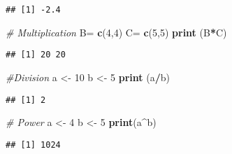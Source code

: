 \documentclass[
]{article}
\newenvironment{Shaded}{\begin{snugshade}}{\end{snugshade}}
\newcommand{\CommentTok}[1]{\textcolor[rgb]{0.56,0.35,0.01}{\textit{#1}}}
\newcommand{\DecValTok}[1]{\textcolor[rgb]{0.00,0.00,0.81}{#1}}
\newcommand{\FunctionTok}[1]{\textcolor[rgb]{0.13,0.29,0.53}{\textbf{#1}}}
\newcommand{\NormalTok}[1]{#1}
\newcommand{\OtherTok}[1]{\textcolor[rgb]{0.56,0.35,0.01}{#1}}
\newcommand{\SpecialCharTok}[1]{\textcolor[rgb]{0.81,0.36,0.00}{\textbf{#1}}}
\begin{document}
\begin{verbatim}
## [1] -2.4
\end{verbatim}

\begin{Shaded}
\begin{Highlighting}[]
\CommentTok{\# Multiplication}
\NormalTok{B}\OtherTok{=} \FunctionTok{c}\NormalTok{(}\DecValTok{4}\NormalTok{,}\DecValTok{4}\NormalTok{) }
\NormalTok{C}\OtherTok{=} \FunctionTok{c}\NormalTok{(}\DecValTok{5}\NormalTok{,}\DecValTok{5}\NormalTok{)}
\FunctionTok{print}\NormalTok{ (B}\SpecialCharTok{*}\NormalTok{C)}
\end{Highlighting}
\end{Shaded}

\begin{verbatim}
## [1] 20 20
\end{verbatim}

\begin{Shaded}
\begin{Highlighting}[]
\CommentTok{\#Division}
\NormalTok{ a }\OtherTok{\textless{}{-}} \DecValTok{10}
\NormalTok{ b }\OtherTok{\textless{}{-}} \DecValTok{5}
 \FunctionTok{print}\NormalTok{ (a}\SpecialCharTok{/}\NormalTok{b)}
\end{Highlighting}
\end{Shaded}

\begin{verbatim}
## [1] 2
\end{verbatim}

\begin{Shaded}
\begin{Highlighting}[]
\CommentTok{\# Power}
\NormalTok{ a }\OtherTok{\textless{}{-}} \DecValTok{4}
\NormalTok{ b }\OtherTok{\textless{}{-}} \DecValTok{5}
 \FunctionTok{print}\NormalTok{(a}\SpecialCharTok{\^{}}\NormalTok{b)}
\end{Highlighting}
\end{Shaded}

\begin{verbatim}
## [1] 1024
\end{verbatim}
\end{document}
